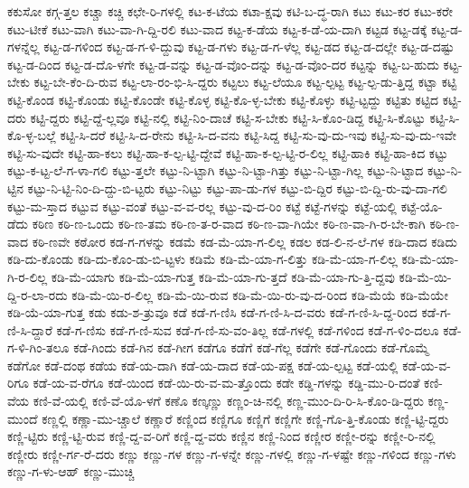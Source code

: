 {ಕಕುಸೋ
ಕಗ್ಗ-ತ್ತಲ
ಕಚ್ಚಾ
ಕಚ್ಚಿ
ಕಛೇ-ರಿ-ಗಳಲ್ಲಿ
ಕಟ-ಕ-ಟೆಯ
ಕಟಾ-ಕ್ಷವು
ಕಟಿ-ಬ-ದ್ಧ-ರಾಗಿ
ಕಟು
ಕಟು-ಕರ
ಕಟು-ಕರೇ
ಕಟು-ಟೀಕೆ
ಕಟು-ವಾಗಿ
ಕಟು-ವಾ-ಗಿ-ದ್ದಿ-ರಲಿ
ಕಟು-ವಾದ
ಕಟ್ಟ-ಕ-ಡೆಯ
ಕಟ್ಟ-ಕ-ಡೆ-ಯ-ದಾಗಿ
ಕಟ್ಟಡ
ಕಟ್ಟ-ಡಕ್ಕೆ
ಕಟ್ಟ-ಡ-ಗಳನ್ನೆಲ್ಲ
ಕಟ್ಟ-ಡ-ಗಳಿಂದ
ಕಟ್ಟ-ಡ-ಗ-ಳಿ-ದ್ದುವು
ಕಟ್ಟ-ಡ-ಗಳು
ಕಟ್ಟ-ಡ-ಗ-ಳೆಲ್ಲ
ಕಟ್ಟ-ಡದ
ಕಟ್ಟ-ಡ-ದಲ್ಲೇ
ಕಟ್ಟ-ಡ-ದಷ್ಟು
ಕಟ್ಟ-ಡ-ದಿಂದ
ಕಟ್ಟ-ಡ-ದೊ-ಳಗೇ
ಕಟ್ಟ-ಡ-ವನ್ನು
ಕಟ್ಟ-ಡ-ವೊಂ-ದನ್ನು
ಕಟ್ಟ-ಡ-ವೊಂ-ದರ
ಕಟ್ಟನ್ನು
ಕಟ್ಟ-ಬ-ಹುದು
ಕಟ್ಟ-ಬೇಕು
ಕಟ್ಟ-ಬೇ-ಕೆಂ-ದಿ-ರುವ
ಕಟ್ಟ-ಲಾ-ರಂ-ಭಿ-ಸಿ-ದ್ದರು
ಕಟ್ಟಲು
ಕಟ್ಟ-ಲೆಯೂ
ಕಟ್ಟ-ಲ್ಪಟ್ಟ
ಕಟ್ಟ-ಲ್ಪ-ಡು-ತ್ತಿದ್ದ
ಕಟ್ಟಾ
ಕಟ್ಟಿ
ಕಟ್ಟಿ-ಕೊಂಡ
ಕಟ್ಟಿ-ಕೊಂಡು
ಕಟ್ಟಿ-ಕೊಂಡೇ
ಕಟ್ಟಿ-ಕೊಳ್ಳ
ಕಟ್ಟಿ-ಕೊ-ಳ್ಳ-ಬೇಕು
ಕಟ್ಟಿ-ಕೊಳ್ಳು
ಕಟ್ಟಿ-ಟ್ಟದ್ದು
ಕಟ್ಟಿತು
ಕಟ್ಟಿದ
ಕಟ್ಟಿ-ದರು
ಕಟ್ಟಿ-ದ್ದರು
ಕಟ್ಟಿ-ದ್ದೆ-ಲ್ಲವೂ
ಕಟ್ಟಿ-ನಲ್ಲಿ
ಕಟ್ಟಿ-ನಿಂ-ದಾಚೆ
ಕಟ್ಟಿ-ಸ-ಬೇಕು
ಕಟ್ಟಿ-ಸಿ-ಕೊಂ-ಡಿದ್ದ
ಕಟ್ಟಿ-ಸಿ-ಕೊಟ್ಟು
ಕಟ್ಟಿ-ಸಿ-ಕೊ-ಳ್ಳ-ಬಲ್ಲೆ
ಕಟ್ಟಿ-ಸಿ-ದರೆ
ಕಟ್ಟಿ-ಸಿ-ದ-ರೇನು
ಕಟ್ಟಿ-ಸಿ-ದ-ವನು
ಕಟ್ಟಿ-ಸಿದ್ದ
ಕಟ್ಟಿ-ಸು-ವು-ದು-ಇವು
ಕಟ್ಟಿ-ಸು-ವು-ದು-ಇವೇ
ಕಟ್ಟಿ-ಸು-ವುದೇ
ಕಟ್ಟಿ-ಹಾ-ಕಲು
ಕಟ್ಟಿ-ಹಾ-ಕ-ಲ್ಪ-ಟ್ಟಿ-ದ್ದೇವೆ
ಕಟ್ಟಿ-ಹಾ-ಕ-ಲ್ಪ-ಟ್ಟಿ-ರ-ಲಿಲ್ಲ
ಕಟ್ಟಿ-ಹಾಕಿ
ಕಟ್ಟಿ-ಹಾ-ಕಿದ
ಕಟ್ಟು
ಕಟ್ಟು-ಕ-ಟ್ಟ-ಲೆ-ಗ-ಳಾ-ಗಲಿ
ಕಟ್ಟು-ತ್ತಲೇ
ಕಟ್ಟು-ನಿ-ಟ್ಟಾಗಿ
ಕಟ್ಟು-ನಿ-ಟ್ಟಾ-ಗಿತ್ತು
ಕಟ್ಟು-ನಿ-ಟ್ಟಾ-ಗಿಲ್ಲ
ಕಟ್ಟು-ನಿ-ಟ್ಟಾದ
ಕಟ್ಟು-ನಿ-ಟ್ಟಿನ
ಕಟ್ಟು-ನಿ-ಟ್ಟಿ-ನಿಂ-ದಿ-ದ್ದು-ಬಿ-ಟ್ಟರು
ಕಟ್ಟು-ನಿಟ್ಟು
ಕಟ್ಟು-ಪಾ-ಡು-ಗಳ
ಕಟ್ಟು-ಬಿ-ದ್ದಿರ
ಕಟ್ಟು-ಬಿ-ದ್ದಿ-ರು-ವು-ದಾ-ಗಲಿ
ಕಟ್ಟು-ಮ-ಸ್ತಾದ
ಕಟ್ಟುವ
ಕಟ್ಟು-ವಂತೆ
ಕಟ್ಟು-ವ-ವ-ರಲ್ಲ
ಕಟ್ಟು-ವು-ದ-ರಿಂ
ಕಟ್ಟೆ
ಕಟ್ಟೆ-ಗಳನ್ನು
ಕಟ್ಟೆ-ಯಲ್ಲಿ
ಕಟ್ಟೆ-ಯೊ-ಡೆದು
ಕಠಿಣ
ಕಠಿ-ಣ-ಒಂದು
ಕಠಿ-ಣ-ತಮ
ಕಠಿ-ಣ-ತ-ರ-ವಾದ
ಕಠಿ-ಣ-ವಾ-ಗಿಯೇ
ಕಠಿ-ಣ-ವಾ-ಗಿ-ರ-ಬೇ-ಕಾಗಿ
ಕಠಿ-ಣ-ವಾದ
ಕಠಿ-ಣವೇ
ಕಠೋರ
ಕಡ-ಗ-ಗಳನ್ನು
ಕಡಮೆ
ಕಡ-ಮೆ-ಯಾ-ಗ-ಲಿಲ್ಲ
ಕಡಲ
ಕಡ-ಲಿ-ನ-ಲೆ-ಗಳ
ಕಡಿ-ದಾದ
ಕಡಿದು
ಕಡಿ-ದು-ಕೊಂಡು
ಕಡಿ-ದು-ಕೊಂ-ಡು-ಬಿ-ಟ್ಟಳು
ಕಡಿಮೆ
ಕಡಿ-ಮೆ-ಯಾ-ಗ-ಲಿತ್ತು
ಕಡಿ-ಮೆ-ಯಾ-ಗ-ಲಿಲ್ಲ
ಕಡಿ-ಮೆ-ಯಾ-ಗಿ-ರ-ಲಿಲ್ಲ
ಕಡಿ-ಮೆ-ಯಾಗು
ಕಡಿ-ಮೆ-ಯಾ-ಗುತ್ತ
ಕಡಿ-ಮೆ-ಯಾ-ಗು-ತ್ತದೆ
ಕಡಿ-ಮೆ-ಯಾ-ಗು-ತ್ತಿ-ದ್ದವು
ಕಡಿ-ಮೆ-ಯಿ-ದ್ದಿ-ರ-ಲಾ-ರದು
ಕಡಿ-ಮೆ-ಯಿ-ರ-ಲಿಲ್ಲ
ಕಡಿ-ಮೆ-ಯಿ-ರುವ
ಕಡಿ-ಮೆ-ಯಿ-ರು-ವು-ದ-ರಿಂದ
ಕಡಿ-ಮೆಯೆ
ಕಡಿ-ಮೆಯೇ
ಕಡಿ-ಯೆ-ಯಾ-ಗುತ್ತ
ಕಡು
ಕಡು-ಶ-ತ್ರುವೂ
ಕಡೆ
ಕಡೆ-ಗ-ಣಿಸಿ
ಕಡೆ-ಗ-ಣಿ-ಸಿ-ದ-ವರು
ಕಡೆ-ಗ-ಣಿ-ಸಿ-ದ್ದ-ರಿಂದ
ಕಡೆ-ಗ-ಣಿ-ಸಿ-ದ್ದಾರೆ
ಕಡೆ-ಗ-ಣಿಸು
ಕಡೆ-ಗ-ಣಿ-ಸುವ
ಕಡೆ-ಗ-ಣಿ-ಸು-ವಂ-ತಿಲ್ಲ
ಕಡೆ-ಗಳಲ್ಲಿ
ಕಡೆ-ಗಳಿಂದ
ಕಡೆ-ಗ-ಳಿಂ-ದಲೂ
ಕಡೆ-ಗ-ಳಿ-ಗಿಂ-ತಲೂ
ಕಡೆ-ಗಿಂದು
ಕಡೆ-ಗಿನ
ಕಡೆ-ಗೀಗ
ಕಡೆಗೂ
ಕಡೆಗೆ
ಕಡೆ-ಗೆಲ್ಲ
ಕಡೆಗೇ
ಕಡೆ-ಗೊಂದು
ಕಡೆ-ಗೊಮ್ಮೆ
ಕಡೆಗೋ
ಕಡೆ-ದಂಥ
ಕಡೆಯ
ಕಡೆ-ಯ-ದಾಗಿ
ಕಡೆ-ಯ-ದಾದ
ಕಡೆ-ಯ-ಪಕ್ಷ
ಕಡೆ-ಯ-ಲ್ಪಟ್ಟ
ಕಡೆ-ಯಲ್ಲಿ
ಕಡೆ-ಯ-ವ-ರಿಗೂ
ಕಡೆ-ಯ-ವ-ರೆಗೂ
ಕಡೆ-ಯಿಂದ
ಕಡೆ-ಯಿ-ರು-ವ-ಮ-ತ್ತೊಂದು
ಕಡೇ
ಕಡ್ಡಿ-ಗಳನ್ನು
ಕಡ್ಡಿ-ಮು-ರಿ-ದಂತೆ
ಕಣಿ-ವೆಯ
ಕಣಿ-ವೆ-ಯಲ್ಲಿ
ಕಣಿ-ವೆ-ಯೊ-ಳಗೆ
ಕಣೊ
ಕಣ್ಕಣ್ಣು
ಕಣ್ಣಂ-ಚಿ-ನಲ್ಲಿ
ಕಣ್ಣ-ಮುಂ-ದಿ-ರಿ-ಸಿ-ಕೊಂ-ಡಿ-ದ್ದರು
ಕಣ್ಣ-ಮುಂದೆ
ಕಣ್ಣಲ್ಲಿ
ಕಣ್ಣಾ-ಮು-ಚ್ಚಾಲೆ
ಕಣ್ಣಾರೆ
ಕಣ್ಣಿಂದ
ಕಣ್ಣಿಗೂ
ಕಣ್ಣಿಗೆ
ಕಣ್ಣಿಗೇ
ಕಣ್ಣಿ-ಗೊ-ತ್ತಿ-ಕೊಂಡು
ಕಣ್ಣಿ-ಟ್ಟಿ-ದ್ದರು
ಕಣ್ಣಿ-ಟ್ಟಿರು
ಕಣ್ಣಿ-ಟ್ಟಿ-ರುವ
ಕಣ್ಣಿ-ದ್ದ-ವ-ರಿಗೆ
ಕಣ್ಣಿ-ದ್ದ-ವರು
ಕಣ್ಣಿನ
ಕಣ್ಣಿ-ನಿಂದ
ಕಣ್ಣೀರ
ಕಣ್ಣೀ-ರನ್ನು
ಕಣ್ಣೀ-ರಿ-ನಲ್ಲಿ
ಕಣ್ಣೀರು
ಕಣ್ಣೀ-ರ್ಗ-ರೆ-ದರು
ಕಣ್ಣು
ಕಣ್ಣು-ಗಳ
ಕಣ್ಣು-ಗ-ಳನ್ನೇ
ಕಣ್ಣು-ಗಳಲ್ಲಿ
ಕಣ್ಣು-ಗ-ಳಷ್ಟೇ
ಕಣ್ಣು-ಗಳಿಂದ
ಕಣ್ಣು-ಗಳು
ಕಣ್ಣು-ಗ-ಳು-ಆಹ್
ಕಣ್ಣು-ಮುಚ್ಚಿ
}

